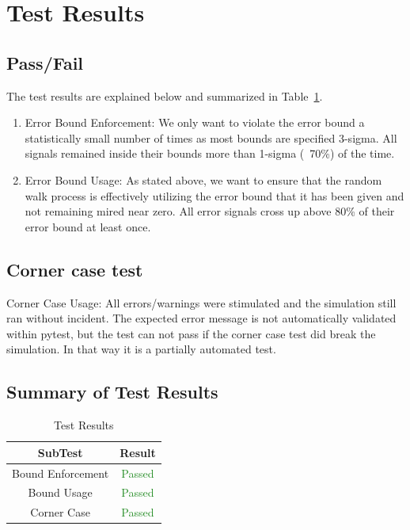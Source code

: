 \section{Test Results}

\subsection{Pass/Fail}
The test results are explained below and summarized in Table~\ref{tab:results}.

\begin{enumerate}
	\item{Error Bound Enforcement: We only want to violate the error bound a
		statistically small number of times as most bounds are specified 3-sigma.
		All signals remained inside their bounds more than 1-sigma (~70\%) of the time.  }
	\item{Error Bound Usage: As stated above, we want to ensure that the random
		walk process is effectively utilizing the error bound that it has been
		given and not remaining mired near zero.  All error signals cross up above
		80\% of their error bound at least once.}
\end{enumerate}

\subsection{Corner case test}

Corner Case Usage: All errors/warnings were stimulated and the simulation still ran without incident.
The expected error message is not automatically validated within pytest, but the test can not pass
if the corner case test did break the simulation. In that way it is a partially automated test.

\subsection{Summary of Test Results}

\begin{table}[htbp]
	\caption{Test Results}
	\label{tab:results}
	\centering \fontsize{10}{10}\selectfont
	\begin{tabular}{|c||c|}
		\hline
		SubTest & Result \\ \hline \hline
		Bound Enforcement& \textcolor{ForestGreen}{Passed} \\ \hline
		Bound Usage &  \textcolor{ForestGreen}{Passed}\\ \hline
		Corner Case &  \textcolor{ForestGreen}{Passed}\\ \hline
	\end{tabular}
\end{table}

